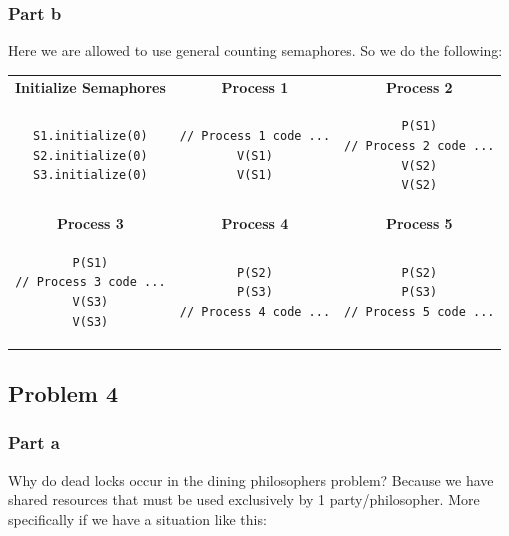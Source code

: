 \documentclass[english]{article}
\begin{document}
\subsubsection*{Part b}
Here we are allowed to use general counting semaphores. So we do the following:
\begin{table}[ht!]
\begin{tabular}{|c|c|c|}
\hline
\textbf{Initialize Semaphores} & \textbf{Process 1} & \textbf{Process 2}  \\

\begin{lstlisting}
S1.initialize(0)
S2.initialize(0)
S3.initialize(0)
\end{lstlisting}
 & 
 \begin{lstlisting}
// Process 1 code ...
V(S1)
V(S1)
\end{lstlisting}
& 
\begin{lstlisting}
P(S1)
// Process 2 code ...
V(S2)
V(S2)
\end{lstlisting} \\ \hline \hline
\textbf{Process 3} & \textbf{Process 4} & \textbf{Process 5} \\

\begin{lstlisting}
P(S1)
// Process 3 code ...
V(S3)
V(S3)
\end{lstlisting}
& 
\begin{lstlisting}
P(S2)
P(S3)
// Process 4 code ...
\end{lstlisting}
&
\begin{lstlisting}
P(S2)
P(S3)
// Process 5 code ...
\end{lstlisting} \\\hline

\end{tabular}
\end{table}



\subsection*{Problem 4}
\subsubsection*{Part a}
Why do dead locks occur in the dining philosophers problem? Because we have shared resources that must be used exclusively by 1 party/philosopher.
More specifically if we have a situation like this:
\end{document}
